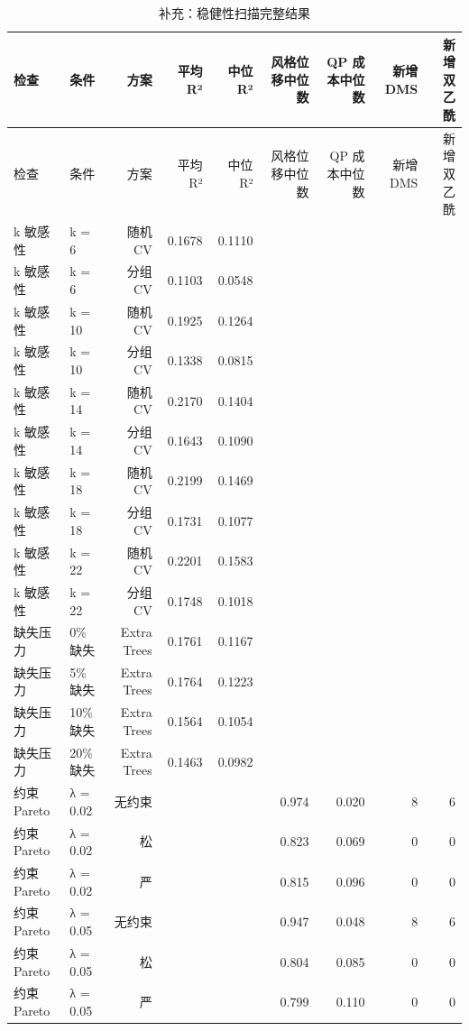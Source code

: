 {\footnotesize
\setlength{\tabcolsep}{3.5pt}
\begin{longtable}{llrrrrrrr}
\caption{补充：稳健性扫描完整结果}
\label{tab:s09_robustness_full}\\
\toprule
检查 & 条件 & 方案 & 平均 R² & 中位 R² & 风格位移中位数 & QP 成本中位数 & 新增 DMS & 新增双乙酰 \\
\midrule
\endfirsthead
\toprule
检查 & 条件 & 方案 & 平均 R² & 中位 R² & 风格位移中位数 & QP 成本中位数 & 新增 DMS & 新增双乙酰 \\
\midrule
\endhead
\bottomrule
\endlastfoot
k 敏感性 & k = 6 & 随机 CV & 0.1678 & 0.1110 &  &  &  &  \\
k 敏感性 & k = 6 & 分组 CV & 0.1103 & 0.0548 &  &  &  &  \\
k 敏感性 & k = 10 & 随机 CV & 0.1925 & 0.1264 &  &  &  &  \\
k 敏感性 & k = 10 & 分组 CV & 0.1338 & 0.0815 &  &  &  &  \\
k 敏感性 & k = 14 & 随机 CV & 0.2170 & 0.1404 &  &  &  &  \\
k 敏感性 & k = 14 & 分组 CV & 0.1643 & 0.1090 &  &  &  &  \\
k 敏感性 & k = 18 & 随机 CV & 0.2199 & 0.1469 &  &  &  &  \\
k 敏感性 & k = 18 & 分组 CV & 0.1731 & 0.1077 &  &  &  &  \\
k 敏感性 & k = 22 & 随机 CV & 0.2201 & 0.1583 &  &  &  &  \\
k 敏感性 & k = 22 & 分组 CV & 0.1748 & 0.1018 &  &  &  &  \\
缺失压力 & 0\% 缺失 & Extra Trees & 0.1761 & 0.1167 &  &  &  &  \\
缺失压力 & 5\% 缺失 & Extra Trees & 0.1764 & 0.1223 &  &  &  &  \\
缺失压力 & 10\% 缺失 & Extra Trees & 0.1564 & 0.1054 &  &  &  &  \\
缺失压力 & 20\% 缺失 & Extra Trees & 0.1463 & 0.0982 &  &  &  &  \\
约束 Pareto & λ = 0.02 & 无约束 &  &  & 0.974 & 0.020 & 8 & 6 \\
约束 Pareto & λ = 0.02 & 松 &  &  & 0.823 & 0.069 & 0 & 0 \\
约束 Pareto & λ = 0.02 & 严 &  &  & 0.815 & 0.096 & 0 & 0 \\
约束 Pareto & λ = 0.05 & 无约束 &  &  & 0.947 & 0.048 & 8 & 6 \\
约束 Pareto & λ = 0.05 & 松 &  &  & 0.804 & 0.085 & 0 & 0 \\
约束 Pareto & λ = 0.05 & 严 &  &  & 0.799 & 0.110 & 0 & 0 \\

\end{longtable}}
